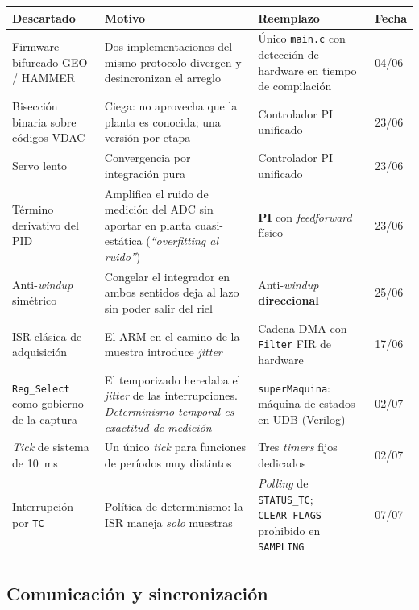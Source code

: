 \begin{center}\footnotesize
\begin{tabularx}{\textwidth}{@{}l X X l@{}}
\toprule
\textbf{Descartado} & \textbf{Motivo} & \textbf{Reemplazo} & \textbf{Fecha} \\
\midrule
Firmware bifurcado GEO / HAMMER
& Dos implementaciones del mismo protocolo divergen y desincronizan el arreglo
& \'Unico \texttt{main.c} con detecci\'on de hardware en tiempo de compilaci\'on
& 04/06 \\
\addlinespace[2pt]
Bisecci\'on binaria sobre c\'odigos VDAC
& Ciega: no aprovecha que la planta es conocida; una versi\'on por etapa
& Controlador PI unificado
& 23/06 \\
\addlinespace[2pt]
Servo lento
& Convergencia por integraci\'on pura
& Controlador PI unificado
& 23/06 \\
\addlinespace[2pt]
T\'ermino derivativo del PID
& Amplifica el ruido de medici\'on del ADC sin aportar en planta cuasi-est\'atica (\emph{``overfitting al ruido''})
& \textbf{PI} con \emph{feedforward} f\'isico
& 23/06 \\
\addlinespace[2pt]
Anti-\emph{windup} sim\'etrico
& Congelar el integrador en ambos sentidos deja al lazo sin poder salir del riel
& Anti-\emph{windup} \textbf{direccional}
& 25/06 \\
\addlinespace[2pt]
ISR cl\'asica de adquisici\'on
& El ARM en el camino de la muestra introduce \emph{jitter}
& Cadena DMA con \texttt{Filter} FIR de hardware
& 17/06 \\
\addlinespace[2pt]
\texttt{Reg\_Select} como gobierno de la captura
& El temporizado heredaba el \emph{jitter} de las interrupciones. \emph{Determinismo temporal es exactitud de medici\'on}
& \texttt{superMaquina}: m\'aquina de estados en UDB (Verilog)
& 02/07 \\
\addlinespace[2pt]
\emph{Tick} de sistema de \SI{10}{\milli\second}
& Un \'unico \emph{tick} para funciones de per\'iodos muy distintos
& Tres \emph{timers} fijos dedicados
& 02/07 \\
\addlinespace[2pt]
Interrupci\'on por \texttt{TC}
& Pol\'itica de determinismo: la ISR maneja \emph{solo} muestras
& \emph{Polling} de \texttt{STATUS\_TC}; \texttt{CLEAR\_FLAGS} prohibido en \texttt{SAMPLING}
& 07/07 \\
\bottomrule
\end{tabularx}
\end{center}

\subsection{Comunicaci\'on y sincronizaci\'on}

